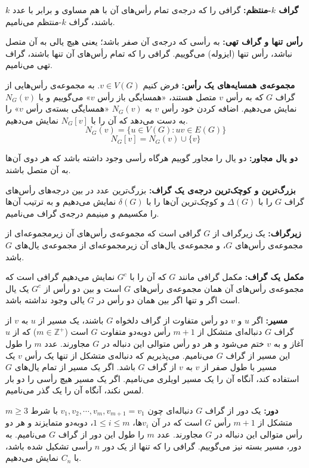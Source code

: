 \textbf{گراف $k$-منتظم:}
گرافی را که درجه‌ی تمام رأس‌های آن با هم مساوی و برابر با عدد $k$ باشند، گراف $k$-منتظم می‌نامیم.

\textbf{رأس تنها و گراف تهی:}
به رأسی که درجه‌ی آن صفر باشد؛ یعنی هیچ یالی به آن متصل نباشد، رأس تنها (ایزوله) می‌گوییم. گرافی را که تمام رأس‌های آن تنها باشند، گراف تهی می‌نامیم.

\textbf{مجموعه‌ی همسایه‌های یک رأس:}
فرض کنیم
$v \in V(G)$.
به مجموعه‌ی رأس‌هایی از گراف $G$ که به رأس $v$ متصل هستند، «همسایگی باز رأس $v$» می‌گوییم و با
$N_G(v)$
نمایش می‌دهیم. اضافه کردن خود رأس $v$ به
$N_G(v)$
«همسایگی بسته‌ی رأس $v$» را به دست می‌دهد که آن را با
$N_G[v]$
نمایش می‌دهیم.
$$N_G(v)=\{u \in V(G) : uv \in E(G)\}$$
$$N_G[v]=N_G(v) \cup \{v\}$$

\textbf{دو یال مجاور:}
دو یال را مجاور گوییم هرگاه رأسی وجود داشته باشد که هر دوی آن‌ها به آن متصل باشند.

\textbf{بزرگ‌ترین و کوچک‌ترین درجه‌ی یک گراف:}
بزرگ‌ترین عدد در بین درجه‌های رأس‌های گراف $G$ را با
$\Delta(G)$
و کوچک‌ترین آن‌ها را با
$\delta(G)$
نمایش می‌دهیم و به ترتیب آن‌ها را مکسیمم و مینیمم درجه‌ی گراف می‌نامیم.

\textbf{زیرگراف:}
یک زیرگراف از $G$ گرافی است که مجموعه‌ی رأس‌های آن زیرمجموعه‌ای از مجموعه‌ی رأس‌های $G$، و مجموعه‌ی یال‌های آن زیرمجموعه‌ای از مجموعه‌ی یال‌های $G$ باشد.

\textbf{مکمل یک گراف:}
مکمل گرافی مانند $G$ که آن را با
$G^c$
نمایش می‌دهیم گرافی است که مجموعه‌ی رأس‌های آن همان مجموعه‌ی رأس‌های $G$ است و بین دو رأس از
$G^c$
یک یال است اگر و تنها اگر بین همان دو رأس در $G$ یالی وجود نداشته باشد.

\textbf{مسیر:}
اگر $u$ و $v$ دو رأس متفاوت از گراف دلخواه $G$ باشند، یک مسیر از $u$ به $v$ از گراف $G$ دنباله‌ای متشکل از
$m+1$
رأس دوبه‌دو متفاوت $G$ است
($m \in \mathbb{Z}^+$)
که از $u$ آغاز و به $v$ ختم می‌شود و هر دو رأس متوالی این دنباله در $G$ مجاورند. عدد $m$ را طول این مسیر از گراف $G$ می‌نامیم. می‌پذیریم که دنباله‌ی متشکل از تنها یک رأس $v$ یک مسیر با طول صفر از $v$ به $v$ از گراف $G$ باشد. اگر یک مسیر از تمام یال‌های $G$ استفاده کند، آنگاه آن را یک مسیر اویلری می‌نامیم. اگر یک مسیر هیچ رأسی را دو بار لمس نکند، آنگاه آن را یک گذر می‌نامیم.

\textbf{دور:}
یک دور از گراف $G$ دنباله‌ای چون
$v_1, v_2, \cdots, v_m, v_{m+1}=v_1$
با شرط
$m \geq 3$
متشکل از
$m+1$
رأس $G$ است که در آن
$v_i$ها،
$1 \leq i \leq m$،
دوبه‌دو متمایزند و هر دو رأس متوالی این دنباله در $G$ مجاورند. عدد $m$ را طول این دور از گراف $G$ می‌نامیم. به دور، مسیر بسته نیز می‌گوییم. گرافی را که تنها از یک دور $n$ رأسی تشکیل شده باشد، با
$C_n$
نمایش می‌دهیم.

